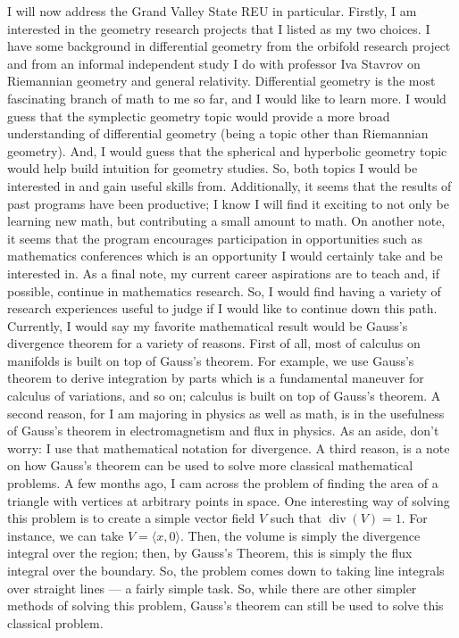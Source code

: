 \documentclass[12pt]{amsart}
\DeclareMathOperator{\Div}{div}
\begin{document}
I will now address the Grand Valley State REU in particular. Firstly, I am
interested in the geometry research projects that I listed as my two
choices. I have some background in differential geometry from the orbifold
research project and from an informal independent study I do with professor
Iva Stavrov on Riemannian geometry and general relativity. Differential
geometry is the most fascinating branch of math to me so far, and I would
like to learn more. I would guess that the symplectic geometry topic would
provide a more broad understanding of differential geometry (being a topic
other than Riemannian geometry). And, I would guess that the spherical and
hyperbolic geometry topic would help build intuition for geometry studies.
So, both topics I would be interested in and gain useful skills from.
Additionally, it seems that the results of past programs have been
productive; I know I will find it exciting to not only be learning new
math, but contributing a small amount to math. On another note, it seems
that the program encourages participation in opportunities such as
mathematics conferences which is an opportunity I would certainly take and
be interested in. As a final note, my current career aspirations are to
teach and, if possible, continue in mathematics research. So, I would find
having a variety of research experiences useful to judge if I would like to
continue down this path.\\

Currently, I would say my favorite mathematical result would be Gauss's
divergence theorem for a variety of reasons. First of all, most of calculus
on manifolds is built on top of Gauss's theorem. For example,
we use Gauss's theorem to derive integration by parts which is a
fundamental maneuver for calculus of variations, and so on; calculus is
built on top of Gauss's theorem. A second reason, for I am majoring in
physics as well as math, is in the usefulness of Gauss's theorem in
electromagnetism and flux in physics. As an aside, don't worry: I use that
mathematical notation for divergence. A third reason, is a note on how
Gauss's theorem can be used to solve more classical mathematical problems.
A few months ago, I cam across the problem of finding the area of a
triangle with vertices at arbitrary points in space. One interesting way of
solving this problem is to create a simple vector field $V$ such that
$\Div(V)=1$. For instance, we can take $V = \langle x,0 \rangle$. Then, the
volume is simply the divergence integral over the region; then, by Gauss's
Theorem, this is simply the flux integral over the boundary. So, the
problem comes down to taking line integrals over straight lines --- a
fairly simple task. So, while there are other simpler methods of
solving this problem, Gauss's theorem can still be used to solve this
classical problem. 
\end{document}

